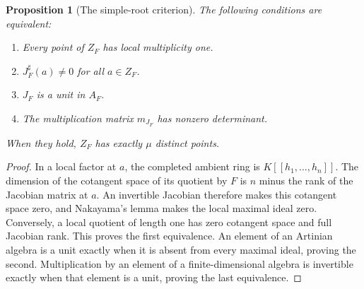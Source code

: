 \documentclass[11pt]{article}
\newtheorem{proposition}[theorem]{Proposition}
\theoremstyle{definition}
\newcommand{\sh}{^{\sharp}}
\begin{document}
\begin{proposition}[The simple-root criterion]\label{prop:jacobian}
The following conditions are equivalent:
\begin{enumerate}
\item Every point of $Z_F$ has local multiplicity one.
\item $J_F\sh(a)\ne0$ for all $a\in Z_F$.
\item $J_F$ is a unit in $A_F$.
\item The multiplication matrix $m_{J_F}$ has nonzero determinant.
\end{enumerate}
When they hold, $Z_F$ has exactly $\mu$ distinct points.
\end{proposition}
\begin{proof}
In a local factor at $a$, the completed ambient ring is $K[[h_1,\ldots,h_n]]$. The dimension of the cotangent space of its quotient by $F$ is $n$ minus the rank of the Jacobian matrix at $a$. An invertible Jacobian therefore makes this cotangent space zero, and Nakayama's lemma makes the local maximal ideal zero. Conversely, a local quotient of length one has zero cotangent space and full Jacobian rank. This proves the first equivalence. An element of an Artinian algebra is a unit exactly when it is absent from every maximal ideal, proving the second. Multiplication by an element of a finite-dimensional algebra is invertible exactly when that element is a unit, proving the last equivalence.
\end{proof}
\end{document}
